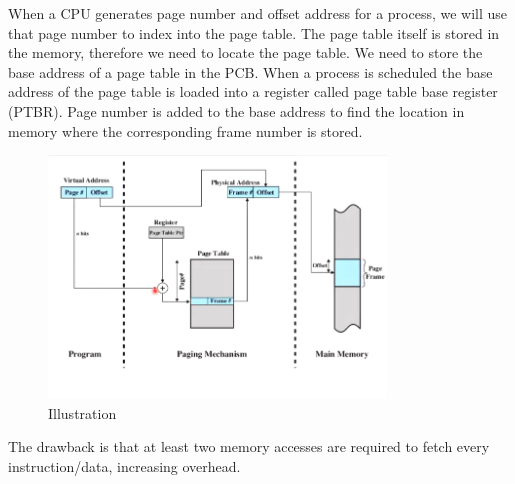 \documentclass[a4paper]{article}
\theoremstyle{plain}
\theoremstyle{definition}
\newtheorem{defn}{Definition}[section]
\theoremstyle{remark}
\begin{document}
\begin{tcolorbox}[colback=black!3!white,colframe=black!60!white,title=\begin{defn}Directly from the memory \label{Directly from the memory}\end{defn}]
When a CPU generates page number and offset address for a process, we will use that page number to index into the page table. The page table itself is stored in the memory, therefore we need to locate the page table. We need to store the base address of a page table in the PCB. When a process is scheduled the base address of the page table is loaded into a register called page table base register (PTBR). Page number is added to the base address to find the location in memory where the corresponding frame number is stored.
\begin{figure}[H]
	\centering
	\includegraphics[width=0.8\textwidth]{seventyfive.png}
	\caption{Illustration}
	\label{fig:seventyfive-png}
\end{figure}
The drawback is that at least two memory accesses are required to fetch every instruction/data, increasing overhead.
\end{tcolorbox}
\end{document}
